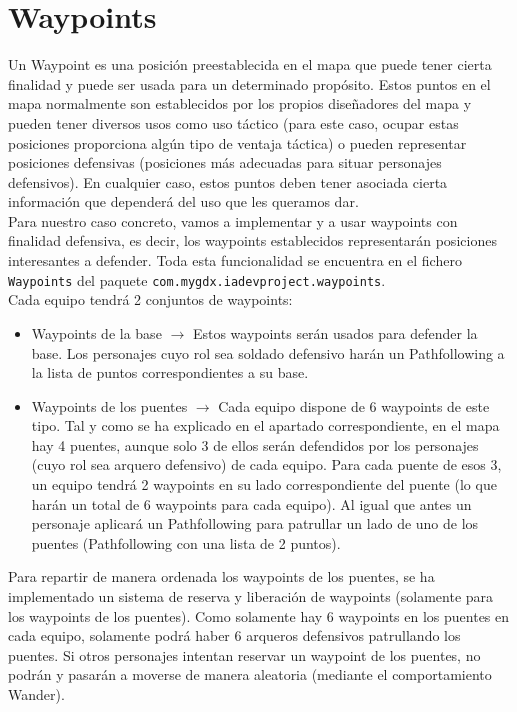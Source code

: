 \medskip
\section{Waypoints}
\label{waypoints}

Un Waypoint es una posición preestablecida en el mapa que puede tener cierta finalidad y puede ser usada para un determinado propósito. Estos puntos en el mapa normalmente son establecidos por los propios diseñadores del mapa y pueden tener diversos usos como uso táctico (para este caso, ocupar estas posiciones proporciona algún tipo de ventaja táctica) o pueden representar posiciones defensivas (posiciones más adecuadas para situar personajes defensivos). En cualquier caso, estos puntos deben tener asociada cierta información que dependerá del uso que les queramos dar. \\

Para nuestro caso concreto, vamos a implementar y a usar waypoints con finalidad defensiva, es decir, los waypoints establecidos representarán posiciones interesantes a defender. Toda esta funcionalidad se encuentra en el fichero \texttt{Waypoints} del paquete \texttt{com.mygdx.iadevproject.waypoints}. \\

Cada equipo tendrá 2 conjuntos de waypoints:
\begin{itemize}
	\item Waypoints de la base $\rightarrow$ Estos waypoints serán usados para defender la base. Los personajes cuyo rol sea soldado defensivo harán un Pathfollowing a la lista de puntos correspondientes a su base.
	\item Waypoints de los puentes $\rightarrow$ Cada equipo dispone de 6 waypoints de este tipo. Tal y como se ha explicado en el apartado correspondiente, en el mapa hay 4 puentes, aunque solo 3 de ellos serán defendidos por los personajes (cuyo rol sea arquero defensivo) de cada equipo. Para cada puente de esos 3, un equipo tendrá 2 waypoints en su lado correspondiente del puente (lo que harán un total de 6 waypoints para cada equipo). Al igual que antes un personaje aplicará un Pathfollowing para patrullar un lado de uno de los puentes (Pathfollowing con una lista de 2 puntos).
\end{itemize}

Para repartir de manera ordenada los waypoints de los puentes, se ha implementado un sistema de reserva y liberación de waypoints (solamente para los waypoints de los puentes). Como solamente hay 6 waypoints en los puentes en cada equipo, solamente podrá haber 6 arqueros defensivos patrullando los puentes. Si otros personajes intentan reservar un waypoint de los puentes, no podrán y pasarán a moverse de manera aleatoria (mediante el comportamiento Wander). \\

